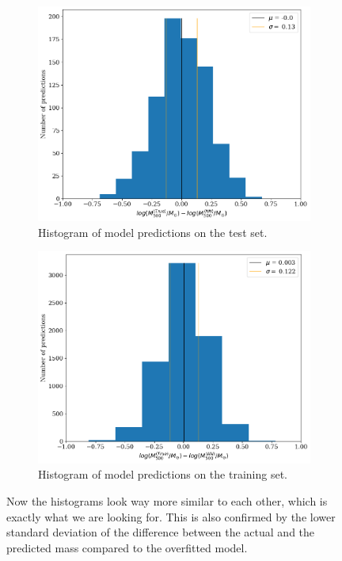 \begin{figure}[H]
\centering
\begin{subfigure}{.46\textwidth}
  \centering
  \includegraphics[width=\linewidth]{images/Chapter4/Basic CNN/best_perf_test_hist.png}
  \caption{Histogram of model predictions on the test set.}
\end{subfigure}%
\hspace{.6em}
\begin{subfigure}{.46\textwidth}
  \centering
  \includegraphics[width=\linewidth]{images/Chapter4/Basic CNN/best_perf_train_hist.png}
  \caption{Histogram of model predictions on the training set.}
\end{subfigure}
\caption{Now the histograms look way more similar to each other, which is exactly what we are looking for. This is also confirmed by the lower standard deviation of the difference between the actual and the predicted mass compared to the overfitted model.} 
\label{fig:short_training_comp_hist}
\end{figure}

